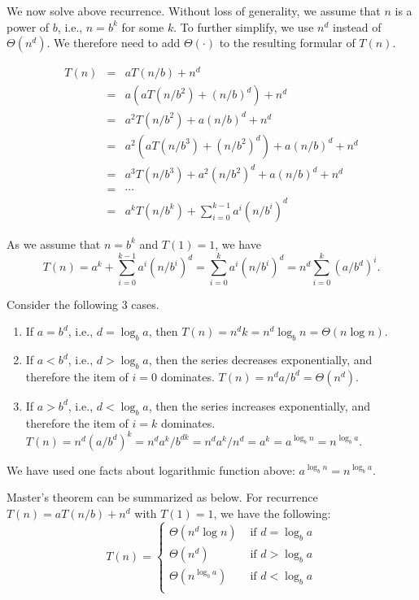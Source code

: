 We now solve above recurrence. Without loss of generality, we assume that $n$ is a power of $b$, i.e., $n = b^k$ for some $k$.
To further simplify, we use $n^d$ instead of $\Theta(n^d)$.
We therefore need to add $\Theta(\cdot)$ to the resulting formular of $T(n)$.

\begin{eqnarray*}
T(n) & = & aT(n/b) + n^d \\
     & = & a(aT(n/b^2) + (n/b)^d) + n^d \\
	 & = & a^2 T(n/b^2) + a(n/b)^d + n^d \\
     & = & a^2(aT(n/b^3) + (n/b^2)^d) + a(n/b)^d + n^d \\
	 & = & a^3 T(n/b^3) + a^2(n/b^2)^d + a(n/b)^d + n^d \\
	 & = & \cdots \\
	 & = & a^k T(n/b^k) + \sum_{i = 0}^{k-1} a^i(n/b^i)^d
\end{eqnarray*}

As we assume that $n = b^k$ and $T(1) = 1$, we have
$$ T(n) =  a^k + \sum_{i = 0}^{k-1} a^i(n/b^i)^d = \sum_{i = 0}^{k} a^i(n/b^i)^d = n^d \sum_{i = 0}^{k} (a/b^d)^i.$$

Consider the following 3 cases. 
\begin{enumerate}
\item If $a = b^d$, i.e., $d = \log_b a$, then $T(n) = n^d k = n^d \log_b n = \Theta(n\log n)$.
\item If $a < b^d$, i.e., $d > \log_b a$, then the series decreases exponentially, and therefore the item of $i = 0$ dominates.  $T(n) = n^d a/b^d = \Theta(n^d)$.
\item If $a > b^d$, i.e., $d < \log_b a$, then the series increases exponentially, and therefore the item of $i = k$ dominates.  
$T(n) = n^d (a/b^d)^k = n^d a^k / b^{dk} = n^d a^k/n^d = a^k = a^{\log_b n} = n^{\log_b a}$.
\end{enumerate}

We have used one facts about logarithmic function above: %
$a^{\log_b n} = n^{\log_b a}$.

Master's theorem can be summarized as below. For recurrence $T(n) = aT(n/b) + n^d$ with $T(1) = 1$, we have the following:
\begin{displaymath}
T(n) = \left\{
\begin{array}{llll}
\Theta(n^d \log n) & \textrm{ if } d = \log_b a \\
\Theta(n^d) & \textrm{ if } d > \log_b a \\
\Theta(n^{\log_b a}) & \textrm{ if } d < \log_b a \\
\end{array}
\right.
\end{displaymath}

